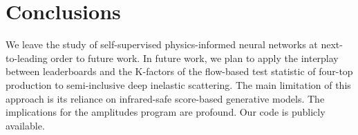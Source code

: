 \section{Conclusions}\label{sec:conclusions}

We leave the study of self-supervised physics-informed neural networks
at next-to-leading order to future work. In future work, we plan to
apply the interplay between leaderboards and the K-factors of the
flow-based test statistic of four-top production to semi-inclusive deep
inelastic scattering. The main limitation of this approach is its
reliance on infrared-safe score-based generative models. The
implications for the amplitudes program are profound. Our code is
publicly available.

